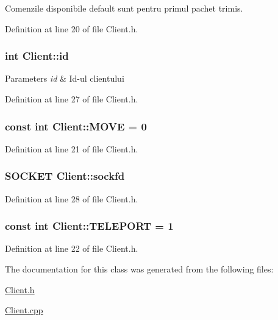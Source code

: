 Comenzile disponibile default sunt pentru primul pachet trimis. 



Definition at line 20 of file Client.\-h.

\hypertarget{class_client_ab79ad95264939f089a2f0b8e0ca62d37}{
\subsubsection[{id}]{\setlength{\rightskip}{0pt plus 5cm}int Client\-::id}}\label{class_client_ab79ad95264939f089a2f0b8e0ca62d37}

\begin{DoxyParams}{Parameters}
{\em id} & Id-\/ul clientului \\
\hline
\end{DoxyParams}


Definition at line 27 of file Client.\-h.

\hypertarget{class_client_ae09330f26aa036c7443d0b03d32058ca}{
\subsubsection[{M\-O\-V\-E}]{\setlength{\rightskip}{0pt plus 5cm}const int Client\-::\-M\-O\-V\-E = 0\hspace{0.3cm}{\ttfamily [static]}}}\label{class_client_ae09330f26aa036c7443d0b03d32058ca}


Definition at line 21 of file Client.\-h.

\hypertarget{class_client_a030e7dcdc06639d4132975acea6ebaea}{
\subsubsection[{sockfd}]{\setlength{\rightskip}{0pt plus 5cm}S\-O\-C\-K\-E\-T Client\-::sockfd}}\label{class_client_a030e7dcdc06639d4132975acea6ebaea}


Definition at line 28 of file Client.\-h.

\hypertarget{class_client_af0c228a527292f17873ebe6f29c7fce5}{
\subsubsection[{T\-E\-L\-E\-P\-O\-R\-T}]{\setlength{\rightskip}{0pt plus 5cm}const int Client\-::\-T\-E\-L\-E\-P\-O\-R\-T = 1\hspace{0.3cm}{\ttfamily [static]}}}\label{class_client_af0c228a527292f17873ebe6f29c7fce5}


Definition at line 22 of file Client.\-h.



The documentation for this class was generated from the following files\-:\begin{DoxyCompactItemize}
\item 
\hyperlink{_client_8h}{Client.\-h}\item 
\hyperlink{_client_8cpp}{Client.\-cpp}\end{DoxyCompactItemize}
